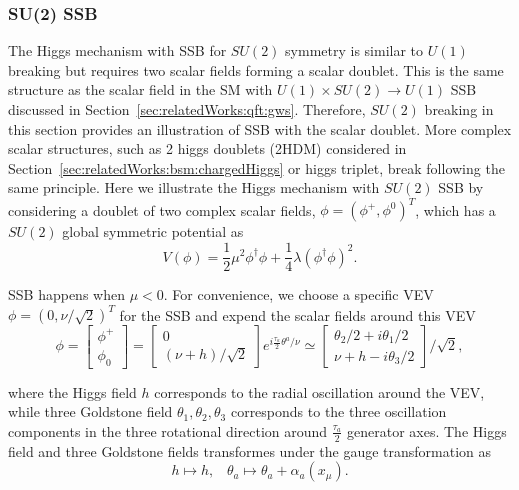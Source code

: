 \subsubsection{SU(2) SSB}
The Higgs mechanism with SSB for $SU(2)$ symmetry is similar to $U(1)$ breaking but requires two scalar fields forming a scalar doublet. This is the same structure as the scalar field in the SM with $U(1)\times SU(2) \to U(1)$ SSB discussed in Section~\ref{sec:relatedWorks:qft:gws}. Therefore,  $SU(2)$ breaking in this section provides an illustration of SSB with the scalar doublet. More complex scalar structures, such as 2 higgs doublets (2HDM) considered in Section~\ref{sec:relatedWorks:bsm:chargedHiggs} or higgs triplet, break following the same principle. Here we illustrate the Higgs mechanism with $SU(2)$ SSB by considering a doublet of two complex scalar fields, $\phi = (\phi^+, \phi^0)^T$, which has a $SU(2)$  global symmetric potential as
\begin{equation}
    V(\phi) = \frac{1}{2} \mu^2 \phi^\dagger\phi + \frac{1}{4} \lambda(\phi^\dagger\phi )^2.
\end{equation}

\noindent SSB happens when $\mu<0$. For convenience, we choose a specific VEV $\phi = (0, \nu/\sqrt{2})^T$ for the SSB and expend the scalar fields around this VEV
\begin{equation}
    \phi = \begin{bmatrix} \phi^+ \\ \phi_0 \end{bmatrix} =
    \begin{bmatrix} 0 \\ (\nu + h)/\sqrt{2} \end{bmatrix} e^{i \frac{\tau_a}{2} \theta^a  /\nu}
    \simeq \begin{bmatrix} \theta_2/2 + i\theta_1/2 \\ \nu + h - i\theta_3/2 \end{bmatrix} /\sqrt{2},
    \label{eqn:relatedWorks:qft:su2Higgs}
\end{equation}

\noindent where the Higgs field $h$ corresponds to the radial oscillation around the VEV, while three Goldstone field $\theta_1,\theta_2,\theta_3$ corresponds to the three oscillation components in the three rotational direction around $\frac{\tau_a}{2}$ generator axes. The Higgs field and three Goldstone fields transformes under the gauge transformation as 
\begin{equation}
    h  \longmapsto  h ,\;\;\; 
    \theta_a  \longmapsto  \theta_a + \alpha_a(x_\mu).
\end{equation}






